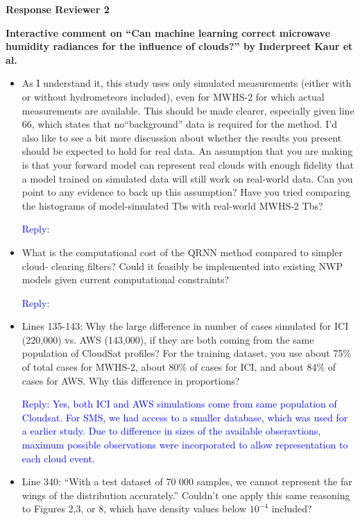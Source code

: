 \documentclass[11pt,a4paper,draft]{article}
\begin{document}
\textbf{Response Reviewer 2}

\textbf{
	Interactive comment on ``Can machine learning
	correct microwave humidity radiances for the
	influence of clouds?'' by Inderpreet Kaur et al.}

\begin{itemize}

\item 			
			As I understand it, this study uses only simulated measurements (either with or without hydrometeors included), even for MWHS-2 for which actual measurements are available. This should be made clearer, especially given line 66, which states that no``background'' data is required for the method. I'd also like to see a bit more discussion 	about whether the results you present should be expected to hold for real data. An assumption that you are making is that your forward model can represent real clouds with enough fidelity that a model trained on simulated data will still work on real-world data. Can you point to any evidence to back up this assumption? Have you tried comparing the histograms of model-simulated Tbs with real-world MWHS-2 Tbs?

\textcolor{blue}{Reply: }

		
\item  	
			What is the computational cost of the QRNN method compared to simpler cloud-
			clearing filters? Could it feasibly be implemented into existing NWP models given
			current computational constraints?

\textcolor{blue}{Reply:}

\item  
			Lines 135-143: Why the large difference in number of cases simulated for ICI (220,000)
			vs. AWS (143,000), if they are both coming from the same population of CloudSat
			profiles? For the training dataset, you use about 75\% of total cases for MWHS-2,
			about 80\% of cases for ICI, and about 84\% of cases for AWS. Why this difference in
			proportions?

\textcolor{blue}{Reply: Yes, both ICI and AWS simulations come from same population of Cloudsat. For SMS, we had access to a smaller database, which was used for a earlier study. Due to difference in sizes of the available obseravtions, maximum possible observations were incorporated to allow  representation to each cloud event. }

\item  
			Line 340: ``With a test dataset of 70 000 samples, we cannot represent the far wings of the distribution accurately.'' Couldn't one apply this same reasoning to Figures 2,3, or
			8, which have density values below $10^{-4}$ included?


\end{itemize}
\end{document}

